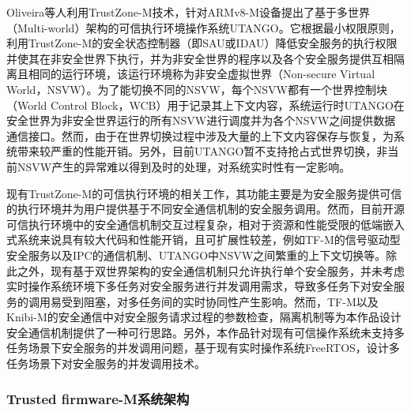 \documentclass[12pt,a4paper]{ctexart}
\numberwithin{figure}{section}
\begin{document}
\par Oliveira\cite{uTango}等人利用TrustZone-M技术，针对ARMv8-M设备提出了基于多世界（Multi-world）架构的可信执行环境操作系统UTANGO。它根据最小权限原则，利用TrustZone-M的安全状态控制器（即SAU或IDAU）降低安全服务的执行权限并使其在非安全世界下执行，并为非安全世界的程序以及各个安全服务提供互相隔离且相同的运行环境，该运行环境称为非安全虚拟世界（Non-secure Virtual World，NSVW）。为了能切换不同的NSVW，每个NSVW都有一个世界控制块（World Control Block，WCB）用于记录其上下文内容，系统运行时UTANGO在安全世界为非安全世界运行的所有NSVW进行调度并为各个NSVW之间提供数据通信接口。然而，由于在世界切换过程中涉及大量的上下文内容保存与恢复，为系统带来较严重的性能开销。另外，目前UTANGO暂不支持抢占式世界切换，非当前NSVW产生的异常难以得到及时的处理，对系统实时性有一定影响。
\par 现有TrustZone-M的可信执行环境的相关工作，其功能主要是为安全服务提供可信的执行环境并为用户提供基于不同安全通信机制的安全服务调用。然而，目前开源可信执行环境中的安全通信机制交互过程复杂，相对于资源和性能受限的低端嵌入式系统来说具有较大代码和性能开销，且可扩展性较差，例如TF-M的信号驱动型安全服务以及IPC的通信机制、UTANGO中NSVW之间繁重的上下文切换等。除此之外，现有基于双世界架构的安全通信机制只允许执行单个安全服务，并未考虑实时操作系统环境下多任务对安全服务进行并发调用需求，导致多任务下对安全服务的调用易受到阻塞，对多任务间的实时协同性产生影响。然而，TF-M以及Knibi-M的安全通信中对安全服务请求过程的参数检查，隔离机制等为本作品设计安全通信机制提供了一种可行思路。另外，本作品针对现有可信操作系统未支持多任务场景下安全服务的并发调用问题，基于现有实时操作系统FreeRTOS，设计多任务场景下对安全服务的并发调用技术。


\subsubsection{Trusted firmware-M系统架构}
\end{document}
